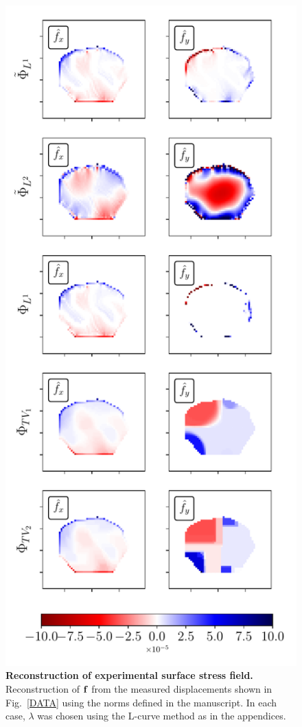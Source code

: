 \documentclass[aps,prl,reprint,twocolumn,groupedaddress,showpacs]{revtex4}
\def\f{{\bf f}}
\begin{document}
\begin{figure}
\includegraphics[width=\linewidth]{fig9}
\caption{\textbf{Reconstruction of experimental surface stress field.}
  Reconstruction of $\f$ from the measured displacements shown in
  Fig.~\ref{DATA} using the norms defined in the manuscript. In each 
  case, $\lambda$ was chosen using the L-curve method as in the appendices.}
\label{DATA2}
\end{figure}
\end{document}
